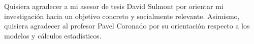 Quisiera agradecer a mi asesor de tesis David Sulmont por orientar mi investigación hacia un objetivo concreto y socialmente relevante. Asimismo, quisiera agradecer al profesor Pavel Coronado por su orientación respecto a los modelos y cálculos estadísticos.